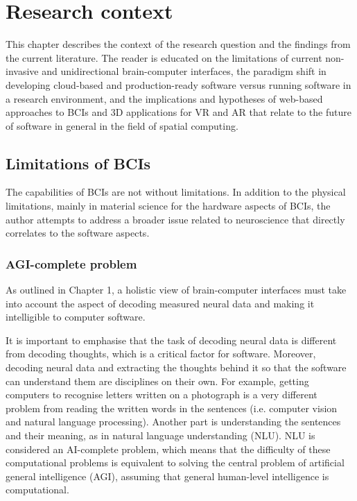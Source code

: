 \chapter{Research context}
\graphicspath{{Chapter2/Figs/}{Chapter2/Figs/}}

This chapter describes the context of the research question and the findings from the current literature. The reader is educated on the limitations of current non-invasive and unidirectional brain-computer interfaces, the paradigm shift in developing cloud-based and production-ready software versus running software in a research environment, and the implications and hypotheses of web-based approaches to BCIs and 3D applications for VR and AR that relate to the future of software in general in the field of spatial computing.

\section{Limitations of BCIs}
\label{chapter2-limitations-of-bcis}

The capabilities of BCIs are not without limitations. In addition to the physical limitations, mainly in material science for the hardware aspects of BCIs, the author attempts to address a broader issue related to neuroscience that directly correlates to the software aspects.

\subsection{AGI-complete problem}
\label{chapter2-agi-complete-problem}

As outlined in Chapter 1, a holistic view of brain-computer interfaces must take into account the aspect of decoding measured neural data and making it intelligible to computer software.

It is important to emphasise that the task of decoding neural data is different from decoding thoughts, which is a critical factor for software. Moreover, decoding neural data and extracting the thoughts behind it so that the software can understand them are disciplines on their own. For example, getting computers to recognise letters written on a photograph is a very different problem from reading the written words in the sentences (i.e. computer vision and natural language processing). Another part is understanding the sentences and their meaning, as in natural language understanding (NLU). NLU is considered an AI-complete problem, which means that the difficulty of these computational problems is equivalent to solving the central problem of artificial general intelligence (AGI), assuming that general human-level intelligence is computational.

